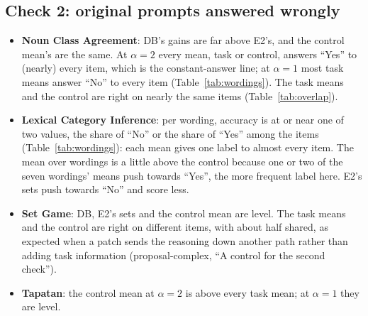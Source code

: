 \documentclass[10pt,a4paper]{article}
\begin{document}
\begin{table}[H]\centering\scriptsize
\resizebox{\linewidth}{!}{}
\caption{Answers on the label tasks, pooled over the means of each condition (task: 7 wordings $\times$ 100 replies; control: 100). Answered: share of replies with an answer under the flexible score; top answer: the most frequent one, with its share of all replies; right: accuracy; one label: the accuracy of giving every answered item the label most frequent among the references of the answered items (unanswered items count as wrong), the line a one-label shift reaches without the task.}
\label{tab:labels}
\end{table}

\subsection{Check 2: original prompts answered wrongly}

\begin{table}[H]\centering\small

\caption{Check 2: the original rules prompts of the first 100 items answered wrongly under them (unpatched accuracy 0 by construction), as Table~\ref{tab:check1}.}
\label{tab:check2}
\end{table}

\begin{itemize}
\item \textbf{Noun Class Agreement}: DB's gains are far above E2's, and the control mean's are the same. At $\alpha=2$ every mean, task or control, answers ``Yes'' to (nearly) every item, which is the constant-answer line; at $\alpha=1$ most task means answer ``No'' to every item (Table~\ref{tab:wordings}). The task means and the control are right on nearly the same items (Table~\ref{tab:overlap}).
\item \textbf{Lexical Category Inference}: per wording, accuracy is at or near one of two values, the share of ``No'' or the share of ``Yes'' among the items (Table~\ref{tab:wordings}): each mean gives one label to almost every item. The mean over wordings is a little above the control because one or two of the seven wordings' means push towards ``Yes'', the more frequent label here. E2's sets push towards ``No'' and score less.
\item \textbf{Set Game}: DB, E2's sets and the control mean are level. The task means and the control are right on different items, with about half shared, as expected when a patch sends the reasoning down another path rather than adding task information (proposal-complex, ``A control for the second check'').
\item \textbf{Tapatan}: the control mean at $\alpha=2$ is above every task mean; at $\alpha=1$ they are level.
\end{itemize}
\end{document}
